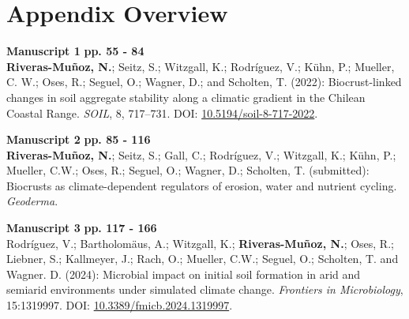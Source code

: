 

\chapter*{Appendix Overview}
\label{chap:appendix_overview} %

\vspace{\baselineskip}


\noindent %
\textbf{Manuscript 1} \hfill \textbf{pp. 55 - 84} \\ %
\textbf{Riveras-Muñoz, N.}; Seitz, S.; Witzgall, K.; Rodríguez, V.; Kühn, P.; Mueller, C. W.; Oses, R.; Seguel, O.; Wagner, D.; and Scholten, T. (2022): Biocrust-linked changes in soil aggregate stability along a climatic gradient in the Chilean Coastal Range. \textit{SOIL}, 8, 717--731. DOI: \href{https://doi.org/10.5194/soil-8-717-2022}{10.5194/soil-8-717-2022}.

\vspace{\baselineskip} %

\noindent
\textbf{Manuscript 2} \hfill \textbf{pp. 85 - 116} \\ %
\textbf{Riveras-Muñoz, N.}; Seitz, S.; Gall, C.; Rodríguez, V.; Witzgall, K.; Kühn, P.; Mueller, C.W.; Oses, R.; Seguel, O.; Wagner, D.; Scholten, T. (submitted): Biocrusts as climate-dependent regulators of erosion, water and nutrient cycling. \textit{Geoderma}.

\vspace{\baselineskip}

\noindent
\textbf{Manuscript 3} \hfill \textbf{pp. 117 - 166} \\ %
Rodríguez, V.; Bartholomäus, A.; Witzgall, K.; \textbf{Riveras-Muñoz, N.}; Oses, R.; Liebner, S.; Kallmeyer, J.; Rach, O.; Mueller, C.W.; Seguel, O.; Scholten, T. and Wagner. D. (2024): Microbial impact on initial soil formation in arid and semiarid environments under simulated climate change. \textit{Frontiers in Microbiology}, 15:1319997. DOI: \href{https://doi.org/10.3389/fmicb.2024.1319997}{10.3389/fmicb.2024.1319997}.

